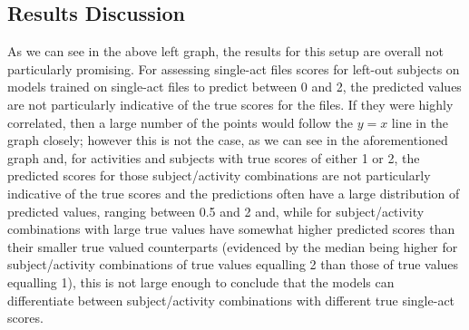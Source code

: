 \documentclass[12pt,twoside]{report}
\begin{document}
\subsection{Results Discussion}

\quad As we can see in the above left graph, the results for this setup are overall not particularly promising. For assessing single-act files scores for left-out subjects on models trained on single-act files to predict between 0 and 2, the predicted values are not particularly indicative of the true scores for the files. If they were highly correlated, then a large number of the points would follow the $y=x$ line in the graph closely; however this is not the case, as we can see in the aforementioned graph and, for activities and subjects with true scores of either 1 or 2, the predicted scores for those subject/activity combinations are not particularly indicative of the true scores and the predictions often have a large distribution of predicted values, ranging between 0.5 and 2 and, while for subject/activity combinations with large true values have somewhat higher predicted scores than their smaller true valued counterparts (evidenced by the median being higher for subject/activity combinations of true values equalling 2 than those of true values equalling 1), this is not large enough to conclude that the models can differentiate between subject/activity combinations with different true single-act scores.\\
\end{document}
